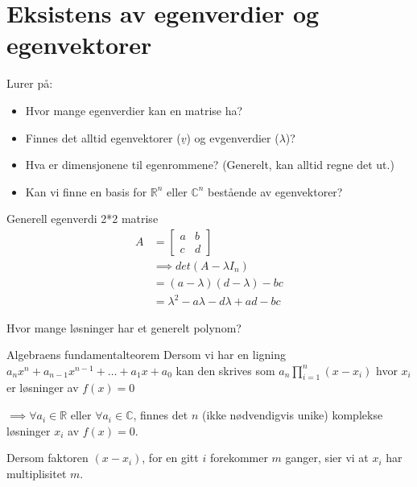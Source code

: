 \documentclass[11pt, a4paper, norsk]{article}
\begin{document}
        \section{Eksistens av egenverdier og egenvektorer}
        
        Lurer på:
        \begin{itemize}
            \item Hvor mange egenverdier kan en matrise ha?
            \item Finnes det alltid egenvektorer ($\underline{v}$) og evgenverdier ($\lambda$)?
            \item  Hva er dimensjonene til egenrommene? (Generelt, kan alltid regne det ut.)
            \item Kan vi finne en basis for $\mathbb{R}^{n}$ eller $\mathbb{C}^{n}$
bestående av egenvektorer?
        \end{itemize}
        
        \begin{Example}{Generell egenverdi 2*2 matrise}{}
            \begin{align*}
                A &= \begin{bmatrix}
                    a & b \\
                    c & d
                \end{bmatrix}
                \\
                  &\implies det(A - \lambda I_{n})
                  \\
                  &= (a-\lambda)(d-\lambda) - bc
                  \\
                  &= \lambda^2 - a\lambda - d\lambda + ad - bc
            \end{align*}
        \end{Example}

        Hvor mange løsninger har et generelt polynom?
        
        \begin{Theorem}{Algebraens fundamentalteorem}{}
            Dersom vi har en ligning $a_{n} x^n + a_{n-1}x^{n-1} + \dots + a_{1}x + a_{0}$ kan den skrives som $a_{n}\prod_{i=1}^{n}(x-x_{i})$ hvor $x_{i}$ er løsninger av $f(x) = 0$

            $\implies \forall a_{i} \in \mathbb{R}$ eller $\forall a_{i} \in \mathbb{C}$, finnes det $n$ (ikke nødvendigvis unike) komplekse løsninger $x_{i}$ av $f(x) = 0$.

            Dersom faktoren $(x-x_{i})$, for en gitt $i$ forekommer $m$ ganger, sier vi at $x_{i}$ har multiplisitet $m$.
        \end{Theorem}
\end{document}
